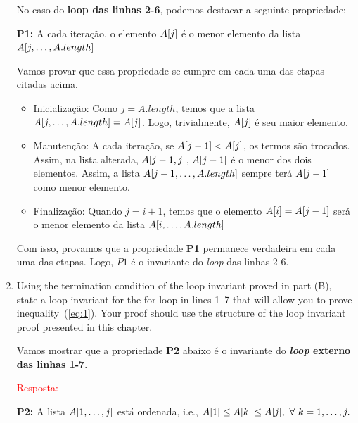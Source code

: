 \documentclass{article}
\begin{document}
\begin{enumerate}[label=\Alph*]
  No caso do \textbf{loop das linhas 2-6}, podemos destacar a seguinte propriedade: 
  \begin{center}
      \textbf{P1:} A cada iteração, o elemento $\normalfont{A}[j]$ é o menor elemento da lista $\normalfont{A}[j,\dots, \normalfont{A}.length]$
  \end{center}
  
  Vamos provar que essa propriedade se cumpre em cada uma das etapas citadas acima. 
  
  \begin{itemize}
      \item Inicialização: Como $j = A.length$, temos que a lista $\normalfont{A}[j, \dots , \normalfont{A}.length] = A[j]$. Logo, trivialmente, $\normalfont{A}[j]$ é seu maior elemento.
      
      \item Manutenção: A cada iteração, se $\normalfont{A}[j-1]<\normalfont{A}[j]$, os termos são trocados. Assim, na lista alterada, $\normalfont{A}[j-1,j]$, $\normalfont{A}[j-1]$ é o menor dos dois elementos. Assim, a lista $\normalfont{A}[j-1,\dots,\normalfont{A}.length]$ sempre terá $\normalfont{A}[j-1]$ como menor elemento.
      
      \item Finalização: Quando $j=i+1$, temos que o elemento $\normalfont{A}[i]=\normalfont{A}[j-1]$ será o menor elemento da lista $\normalfont{A}[i,\dots,\normalfont{A}.length]$
  \end{itemize}
  
    Com isso, provamos que a propriedade \textbf{P1} permanece verdadeira em cada uma das etapas. Logo, $P1$ é o invariante do \textit{loop} das linhas 2-6.
  
  
  
  \item Using the termination condition of the loop invariant proved in part (B), state a loop invariant for the for loop in lines 1–7 that will allow you to prove inequality~(\ref{eq:1}). Your proof should use the structure of the loop invariant proof presented in this chapter.
  
  Vamos mostrar que a propriedade \textbf{P2} abaixo é o invariante do \textbf{\textit{loop} externo das linhas 1-7}.
  
  \textcolor{red}{Resposta: }
  
  \begin{center}
      \textbf{P2:} A lista $\normalfont{A}[1,\dots,j]$ está ordenada, i.e., $\normalfont{A}[1] \leq \normalfont{A}[k] \leq \normalfont{A}[j],~\forall~k=1,\dots,j.$
  \end{center}
  

\end{enumerate}
\end{document}
